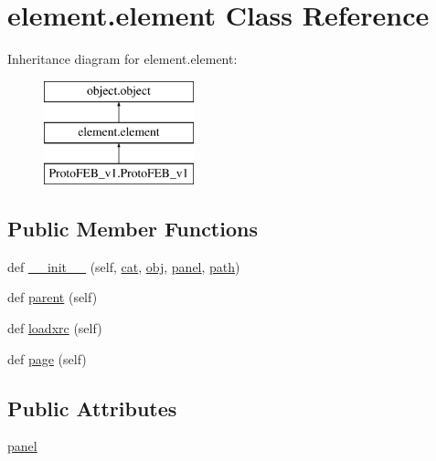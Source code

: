 \hypertarget{classelement_1_1element}{}\section{element.\+element Class Reference}
\label{classelement_1_1element}
Inheritance diagram for element.\+element\+:\begin{figure}[H]
\begin{center}
\leavevmode
\includegraphics[height=3.000000cm]{classelement_1_1element}
\end{center}
\end{figure}
\subsection*{Public Member Functions}
\begin{DoxyCompactItemize}
\item 
def \hyperlink{classelement_1_1element_a72de0f0e7b950dabca314ed77552cb90}{\+\_\+\+\_\+init\+\_\+\+\_\+} (self, \hyperlink{classobject_1_1object_af114388a80cca208c152ffeca0e89e23}{cat}, \hyperlink{classobject_1_1object_a82b61e7cd7e18b1f9de10fc832e5b75e}{obj}, \hyperlink{classelement_1_1element_a0fce7cee12f437717c882d0965e46235}{panel}, \hyperlink{classobject_1_1object_a2a518f960961d791b0f900a90c3cd287}{path})
\item 
def \hyperlink{classelement_1_1element_a2705e2b608db596bedf2a206bda42d12}{parent} (self)
\item 
def \hyperlink{classelement_1_1element_aa9fadd76b299e1dfddd1da112dfe8245}{loadxrc} (self)
\item 
def \hyperlink{classelement_1_1element_a80c5e09b291c255b740787b87760fca0}{page} (self)
\end{DoxyCompactItemize}
\subsection*{Public Attributes}
\begin{DoxyCompactItemize}
\item 
\hyperlink{classelement_1_1element_a0fce7cee12f437717c882d0965e46235}{panel}
\end{DoxyCompactItemize}


